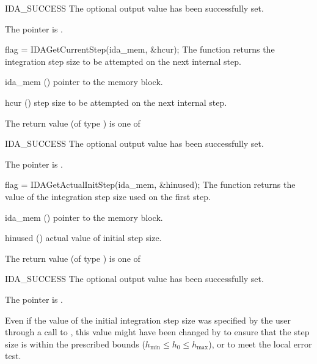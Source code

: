 {{\begin{args}
  \item[IDA\_SUCCESS] 
    The optional output value has been successfully set.
  \item[\Id{IDA\_MEM\_NULL}]
    The  pointer is .
  \end{args}
}
{}
{
  flag = IDAGetCurrentStep(ida\_mem, \&hcur);
}
{
  The function  returns the
  integration step size to be attempted on the next internal step.
}
{
  \begin{args}
  \item[ida\_mem] ()
    pointer to the {\ida} memory block.
  \item[hcur] ()
    step size to be attempted on the next internal step.
  \end{args}
}
{
  The return value  (of type ) is one of
  \begin{args}
  \item[IDA\_SUCCESS] 
    The optional output value has been successfully set.
  \item[\Id{IDA\_MEM\_NULL}]
    The  pointer is .
  \end{args}
}
{}
{
  flag = IDAGetActualInitStep(ida\_mem, \&hinused);
}
{
  The function  returns the
  value of the integration step size used on the first step.
}
{
  \begin{args}
  \item[ida\_mem] ()
    pointer to the {\ida} memory block.
  \item[hinused] ()
    actual value of initial step size.
  \end{args}
}
{
  The return value  (of type ) is one of
  \begin{args}
  \item[IDA\_SUCCESS] 
    The optional output value has been successfully set.
  \item[\Id{IDA\_MEM\_NULL}]
    The  pointer is .
  \end{args}
}
{
  Even if the value of the initial integration step size was specified
  by the user through a call to , this value might have 
  been changed by {\ida} to ensure that the step size is within the 
  prescribed bounds ($h_{\min} \le h_0 \le h_{\max}$), or to meet the
  local error test.
}
}
